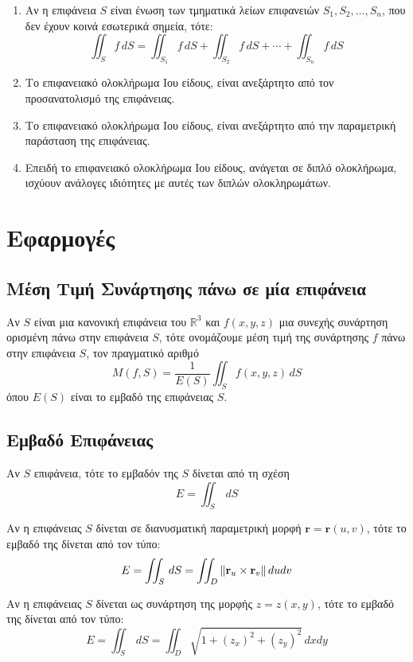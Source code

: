\begin{enumerate}
  \item Αν η επιφάνεια $S$ είναι ένωση των τμηματικά λείων επιφανειών $ S_{1}, S_{2},
    \ldots, S_{n} $, που δεν έχουν κοινά εσωτερικά σημεία, τότε:
    \[
      \iint_{S} f \,{dS} = \iint_{S_{1}} f \,{dS} + \iint_{S_{2}} f \,{dS} +
      \cdots + \iint_{S_{n}} f \,{dS} 
    \] 
  \item Το επιφανειακό ολοκλήρωμα Ιου είδους, είναι ανεξάρτητο από τον προσανατολισμό 
    της επιφάνειας.
  \item Το επιφανειακό ολοκλήρωμα Ιου είδους, είναι ανεξάρτητο από την παραμετρική
    παράσταση της επιφάνειας.
  \item Επειδή το επιφανειακό ολοκλήρωμα Ιου είδους, ανάγεται σε διπλό ολοκλήρωμα, 
    ισχύουν ανάλογες ιδιότητες με αυτές των διπλών ολοκληρωμάτων.
\end{enumerate}

\section{Εφαρμογές}

\subsection*{Μέση Τιμή Συνάρτησης πάνω σε μία επιφάνεια}

Αν $S$ είναι μια κανονική επιφάνεια του $ \mathbb{R}^{3} $ και $ f(x,y,z) $ μια 
συνεχής συνάρτηση ορισμένη πάνω στην επιφάνεια $S$, τότε ονομάζουμε μέση τιμή της 
συνάρτησης $f$ πάνω στην επιφάνεια $S$, τον πραγματικό αριθμό
\[
  M(f,S) = \frac{1}{E(S)} \iint_{S} f(x,y,z) \,{dS} 
\] 
όπου $ E(S) $ είναι το εμβαδό της επιφάνειας $S$.

\subsection*{Εμβαδό Επιφάνειας}

Αν $S$ επιφάνεια, τότε το εμβαδόν της $S$ δίνεται από τη σχέση 
\[
  E = \iint_{S}\,{dS} 
\]

Αν η επιφάνειας $S$ δίνεται σε διανυσματική παραμετρική μορφή 
$ \mathbf{r} = \mathbf{r}(u,v) $, τότε το εμβαδό της δίνεται από τον τύπο:
\[
  E = \iint_{S} \,{dS} = \iint_{D} \norm{\mathbf{r}_{u} \times \mathbf{r}_{v}} \,{du}
  {dv} 
\]

Αν η επιφάνειας $S$ δίνεται ως συνάρτηση της μορφής $ z=z(x,y) $, τότε το εμβαδό της 
δίνεται από τον τύπο:
\[
  E = \iint_{S} \,{dS} = \iint_{D} \sqrt{1 + (z_{x})^{2}+(z_{y})^{2}} \,{dx} {dy} 
\]

